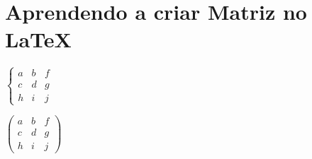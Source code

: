 \documentclass[12pt,a4]{article}
\begin{document}
\headcm \todayr
\section{Aprendendo a criar Matriz no \LaTeX}

$ 
\left\{\begin{array}{ccc}
   a  & b & f\\
   c  & d & g\\
   h  & i & j
\end{array}\right.
$



$ %
\left(\begin{array}{ccc}
   a  & b & f\\
   c  & d & g\\
   h  & i & j
\end{array}\right) %
$
\end{document}
